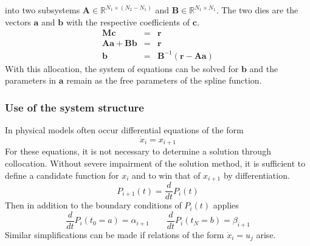 \documentclass[letterpaper,10pt,english]{sphinxmanual}
\begin{document}
into two subsystems \(\boldsymbol{A}\in \mathbb{R}^{N_1 \times (N_2 - N_1)}\) and \(\boldsymbol{B}\in \mathbb{R}^{N_1 \times N_1}\).
The two dies are the vectors \(\boldsymbol{a}\) and \(\boldsymbol{b}\) with the respective coefficients of \(\boldsymbol{c}\).
\begin{eqnarray*}
   \boldsymbol{M} \boldsymbol{c} & = & \boldsymbol{r} \\
   \boldsymbol{A} \boldsymbol{a} + \boldsymbol{B} \boldsymbol{b} & = & \boldsymbol{r} \\
   \boldsymbol{b} & = & \boldsymbol{B}^{-1} (\boldsymbol{r} - \boldsymbol{A} \boldsymbol{a})
\end{eqnarray*}
With this allocation, the system of equations can be solved for \(\boldsymbol{b}\) and the parameters in \(\boldsymbol{a}\)
remain as the free parameters of the spline function.


\subsubsection{Use of the system structure}
\label{guide/background:system-structure}\label{guide/background:use-of-the-system-structure}
In physical models often occur differential equations of the form
\begin{equation*}
    \dot{x}_i = x_{i+1}
\end{equation*}
For these equations, it is not necessary to determine a solution through collocation. Without severe impairment of the solution method,
it is sufficient to define a candidate function for \(x_i\) and to win that of \(x_{i+1}\) by differentiation.
\begin{equation*}
   P_{i+1}(t) = \frac{d}{d t}P_i(t)
\end{equation*}
Then in addition to the boundary conditions of \(P_i(t)\) applies
\begin{equation*}
   \frac{d}{d t}P_i(t_0=a) = \alpha_{i+1} \qquad \frac{d}{d t}P_i(t_N=b) = \beta_{i+1}
\end{equation*}
Similar simplifications can be made if relations of the form \(\dot{x}_i = u_j\) arise.
\end{document}
